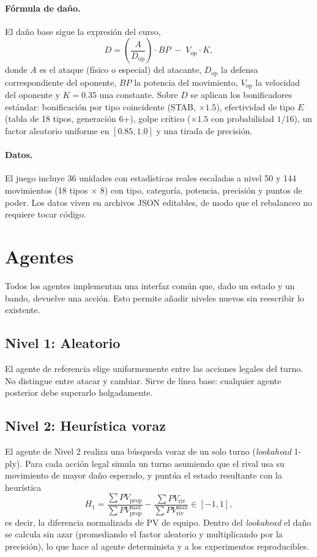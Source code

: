 \documentclass[11pt]{article}
\begin{document}
\paragraph{Fórmula de daño.} El daño base sigue la expresión del curso,
\begin{equation}
  \label{eq:dano}
  D = \left(\frac{A}{D_{\text{op}}}\right)\cdot BP \; - \; V_{\text{op}}\cdot K,
\end{equation}
donde $A$ es el ataque (físico o especial) del atacante, $D_{\text{op}}$ la
defensa correspondiente del oponente, $BP$ la potencia del movimiento,
$V_{\text{op}}$ la velocidad del oponente y $K{=}0.35$ una constante. Sobre
$D$ se aplican los bonificadores estándar: bonificación por tipo coincidente
(STAB, $\times 1.5$), efectividad de tipo $E$ (tabla de 18 tipos, generación 6+),
golpe crítico ($\times 1.5$ con probabilidad $1/16$), un factor aleatorio
uniforme en $[0.85, 1.0]$ y una tirada de precisión.

\paragraph{Datos.} El juego incluye 36 unidades con estadísticas reales
escaladas a nivel 50 y 144 movimientos (18 tipos $\times$ 8) con tipo, categoría,
potencia, precisión y puntos de poder. Los datos viven en archivos JSON
editables, de modo que el rebalanceo no requiere tocar código.

\section{Agentes}
\label{sec:agentes}

Todos los agentes implementan una interfaz común que, dado un estado y un bando,
devuelve una acción. Esto permite añadir niveles nuevos sin reescribir lo
existente.

\subsection{Nivel 1: Aleatorio}
El agente de referencia elige uniformemente entre las acciones legales del turno.
No distingue entre atacar y cambiar. Sirve de línea base: cualquier agente
posterior debe superarlo holgadamente.

\subsection{Nivel 2: Heurística voraz}
El agente de Nivel 2 realiza una búsqueda voraz de un solo turno (\emph{lookahead}
1-ply). Para cada acción legal simula un turno asumiendo que el rival usa su
movimiento de mayor daño esperado, y puntúa el estado resultante con la heurística
\begin{equation}
  \label{eq:h1}
  H_1 = \frac{\sum PV_{\text{prop}}}{\sum PV^{\max}_{\text{prop}}}
      - \frac{\sum PV_{\text{riv}}}{\sum PV^{\max}_{\text{riv}}} \in [-1,1],
\end{equation}
es decir, la diferencia normalizada de PV de equipo. Dentro del \emph{lookahead}
el daño se calcula sin azar (promediando el factor aleatorio y multiplicando por
la precisión), lo que hace al agente determinista y a los experimentos
reproducibles.
\end{document}
